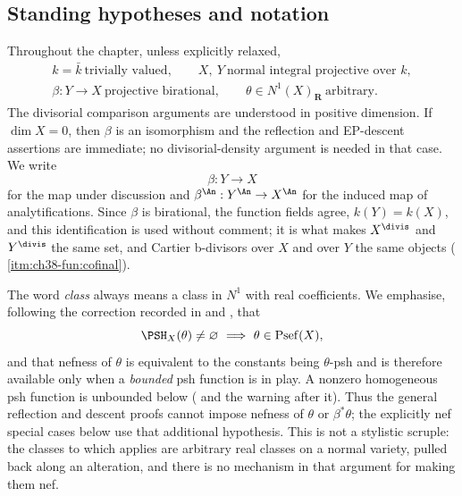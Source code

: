 \subsection{Standing hypotheses and notation}
\label{sec:ch39-hypotheses}

Throughout the chapter, unless explicitly relaxed,
\[
 \begin{gathered}
 k=\bar k\ \text{trivially valued},\qquad
 X,\ Y\ \text{normal integral projective over }k,\\
 \beta:Y\longrightarrow X\ \text{projective birational},\qquad
 \theta\in N^1(X)_{\mathbf R}\ \text{arbitrary}.
 \end{gathered}
\tag{39.1}\label{eq:ch39-standing}
\]
The divisorial comparison arguments are understood in positive dimension.
If $\dim X=0$, then $\beta$ is an isomorphism and the reflection and
EP-descent assertions are immediate; no divisorial-density argument is
needed in that case.
We write
\[
                         \beta:Y\longrightarrow X
\tag{39.2}\label{eq:bj-reflection-map}
\]
for the map under discussion and $\beta^{\An}:Y^{\An}\to X^{\An}$ for the
induced map of analytifications.  Since $\beta$ is birational, the
function fields agree, $k(Y)=k(X)$, and this identification is used
without comment; it is what makes $X^{\divis}$ and $Y^{\divis}$ the same
set, and Cartier b-divisors over $X$ and over $Y$ the same objects
(\,\cref{itm:ch38-fun:cofinal}).

The word \emph{class} always means a class in $N^1$ with real
coefficients.  We emphasise, following the correction recorded in
 and , that
\[
 \PSH_X(\theta)\ne\varnothing
 \ \Longrightarrow\ \theta\in\operatorname{Psef}(X),
\]
and that nefness of $\theta$ is equivalent to the constants being
$\theta$-psh and is therefore available only when a \emph{bounded} psh
function is in play.  A nonzero homogeneous psh function is unbounded
below ( and the warning after
it).  Thus the general reflection and descent proofs cannot impose
nefness of $\theta$ or $\beta^*\theta$; the explicitly nef special cases
below use that additional hypothesis.  This is not a stylistic scruple: the classes to
which  applies
 are arbitrary real classes on a normal
variety, pulled back along an alteration, and there is no mechanism in that
argument for making them nef.

